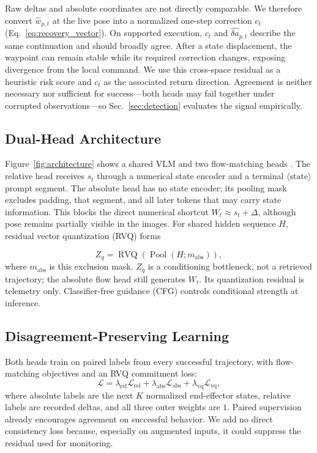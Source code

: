 \documentclass[letterpaper, 10 pt, conference]{ieeeconf}
\begin{document}
Raw deltas and absolute coordinates are not directly comparable. We therefore convert $\hat{w}_{p,t}$ at the live pose into a normalized one-step correction $c_t$ (Eq.~\eqref{eq:recovery_vector}). On supported execution, $c_t$ and $\hat{\delta a}_{p,t}$ describe the same continuation and should broadly agree. After a state displacement, the waypoint can remain stable while its required correction changes, exposing divergence from the local command. We use this cross-space residual as a heuristic risk score and $c_t$ as the associated return direction. Agreement is neither necessary nor sufficient for success---both heads may fail together under corrupted observations---so Sec.~\ref{sec:detection} evaluates the signal empirically.

\subsection{Dual-Head Architecture}
Figure~\ref{fig:architecture} shows a shared VLM and two flow-matching heads \cite{diffusionpolicy,pi0}. The relative head receives $s_t$ through a numerical state encoder and a terminal $\langle\mathrm{state}\rangle$ prompt segment. The absolute head has no state encoder; its pooling mask excludes padding, that segment, and all later tokens that may carry state information. This blocks the direct numerical shortcut $W_t\!\approx\!s_t+\Delta$, although pose remains partially visible in the images. For shared hidden sequence $H$, residual vector quantization (RVQ) \cite{vqvae,rvq} forms

\begin{equation}
    Z_q=\operatorname{RVQ}\!\left(\operatorname{Pool}(H;m_{\mathrm{abs}})\right),
\end{equation}
where $m_{\mathrm{abs}}$ is this exclusion mask. $Z_q$ is a conditioning bottleneck, not a retrieved trajectory; the absolute flow head still generates $W_t$. Its quantization residual is telemetry only. Classifier-free guidance (CFG) \cite{cfg} controls conditional strength at inference.

\subsection{Disagreement-Preserving Learning}
\label{sec:learning}
Both heads train on paired labels from every successful trajectory, with flow-matching objectives and an RVQ commitment loss:
\begin{equation}
    \mathcal{L} =
    \lambda_{\mathrm{rel}}\mathcal{L}_{\mathrm{rel}}
    + \lambda_{\mathrm{abs}}\mathcal{L}_{\mathrm{abs}}
    + \lambda_{\mathrm{vq}}\mathcal{L}_{\mathrm{vq}},
\label{eq:training_loss}
\end{equation}
where absolute labels are the next $K$ normalized end-effector states, relative labels are recorded deltas, and all three outer weights are $1$. Paired supervision already encourages agreement on successful behavior. We add no direct consistency loss because, especially on augmented inputs, it could suppress the residual used for monitoring.
\end{document}
